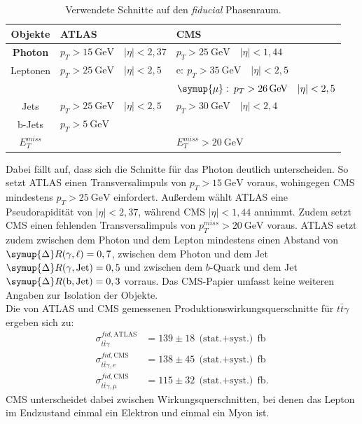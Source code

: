  \begin{table}[H]
     \centering
    \begin{tabular}{c|l|l}
      Objekte & ATLAS & CMS \\
      \hline
      \textbf{Photon} & $p_T > \SI{15}{\giga\electronvolt}\quad |\eta| < 2,37$ & $p_T > \SI{25}{\giga\electronvolt}\quad |\eta| < 1,44$\\
      Leptonen & $p_T > \SI{25}{\giga\electronvolt}\quad |\eta| < 2,5$ & $\text{e}:\: p_T > \SI{35}{\giga\electronvolt}\quad |\eta| < 2,5$ \\
      {} & {} & $\symup{\mu}:\: p_T > \SI{26}{\giga\electronvolt}\quad |\eta| < 2,5$\\
      Jets & $p_T > \SI{25}{\giga\electronvolt}\quad |\eta| < 2,5$ & $p_T > \SI{30}{\giga\electronvolt}\quad |\eta| < 2,4$\\
      b-Jets & $p_T > \SI{5}{\giga\electronvolt}$ &  \\
      $E^{miss}_T$ &  & $E_T^{miss} > \SI{20}{\giga\electronvolt}$
    \end{tabular}
    \caption{Verwendete Schnitte auf den \textit{fiducial} Phasenraum.}
    \label{tab:cut}
 \end{table}
Dabei fällt auf, dass sich die Schnitte für das Photon deutlich unterscheiden. So setzt ATLAS einen Transversalimpuls von $p_{T} > \SI{15}{\giga\electronvolt}$ voraus, wohingegen CMS mindestens $p_{T} > \SI{25}{\giga\electronvolt}$ einfordert. Außerdem wählt ATLAS eine Pseudorapidität von $|\eta| < 2,37$, während CMS $|\eta| < 1,44$ annimmt. Zudem setzt CMS einen fehlenden Transversalimpuls von $p_{T}^{miss} > \SI{20}{\giga\electronvolt}$ voraus.
ATLAS setzt zudem zwischen dem Photon und dem Lepton mindestens einen Abstand von $\symup{\Delta} R(\gamma, \ell) = 0,7$, zwischen dem Photon und dem Jet $\symup{\Delta} R(\gamma, \text{Jet}) = 0,5$ und zwischen dem $b$-Quark und dem Jet $\symup{\Delta} R(\text{b}, \text{Jet}) = 0,3$ vorraus.
Das CMS-Papier umfasst keine weiteren Angaben zur Isolation der Objekte.\\
Die von ATLAS und CMS gemessenen Produktionswirkungsquerschnitte für $t\bar{t}\gamma$ ergeben sich zu:
\begin{align*}
  \sigma^{fid, \text{ATLAS}}_{t\bar{t}\gamma} &= 139 \pm 18~\text{(stat.$+$syst.)}~ \si{\femto\barn}\\
  \sigma^{fid, \text{CMS}}_{t\bar{t}\gamma, e} &= 138 \pm 45~\text{(stat.$+$syst.)}~ \si{\femto\barn}\\
  \sigma^{fid, \text{CMS}}_{t\bar{t}\gamma, \mu} &= 115 \pm 32~\text{(stat.$+$syst.)}~ \si{\femto\barn}.
\end{align*}
CMS unterscheidet dabei zwischen Wirkungsquerschnitten, bei denen das Lepton im Endzustand einmal ein Elektron und einmal ein Myon ist.

